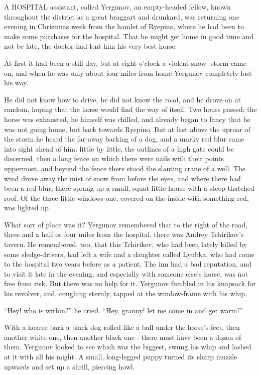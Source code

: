 A HOSPITAL assistant, called Yergunov, an empty-headed fellow, known
throughout the district as a great braggart and drunkard, was returning
one evening in Christmas week from the hamlet of Ryepino, where he had
been to make some purchases for the hospital. That he might get home in
good time and not be late, the doctor had lent him his very best horse.

At first it had been a still day, but at eight o’clock a violent snow-
storm came on, and when he was only about four miles from home Yergunov
completely lost his way.

He did not know how to drive, he did not know the road, and he drove on
at random, hoping that the horse would find the way of itself. Two hours
passed; the horse was exhausted, he himself was chilled, and already
began to fancy that he was not going home, but back towards Ryepino. But
at last above the uproar of the storm he heard the far-away barking of a
dog, and a murky red blur came into sight ahead of him: little by
little, the outlines of a high gate could be discerned, then a long
fence on which there were nails with their points uppermost, and beyond
the fence there stood the slanting crane of a well. The wind drove away
the mist of snow from before the eyes, and where there had been a red
blur, there sprang up a small, squat little house with a steep thatched
roof. Of the three little windows one, covered on the inside with
something red, was lighted up.

What sort of place was it? Yergunov remembered that to the right of the
road, three and a half or four miles from the hospital, there was Andrey
Tchirikov’s tavern. He remembered, too, that this Tchirikov, who had
been lately killed by some sledge-drivers, had left a wife and a
daughter called Lyubka, who had come to the hospital two years before as
a patient. The inn had a bad reputation, and to visit it late in the
evening, and especially with someone else’s horse, was not free from
risk. But there was no help for it. Yergunov fumbled in his knapsack for
his revolver, and, coughing sternly, tapped at the window-frame with his
whip.

“Hey! who is within?” he cried. “Hey, granny! let me come in and get
warm!”

With a hoarse bark a black dog rolled like a ball under the horse’s
feet, then another white one, then another black one—there must have
been a dozen of them. Yergunov looked to see which was the biggest,
swung his whip and lashed at it with all his might. A small, long-legged
puppy turned its sharp muzzle upwards and set up a shrill, piercing
howl.

